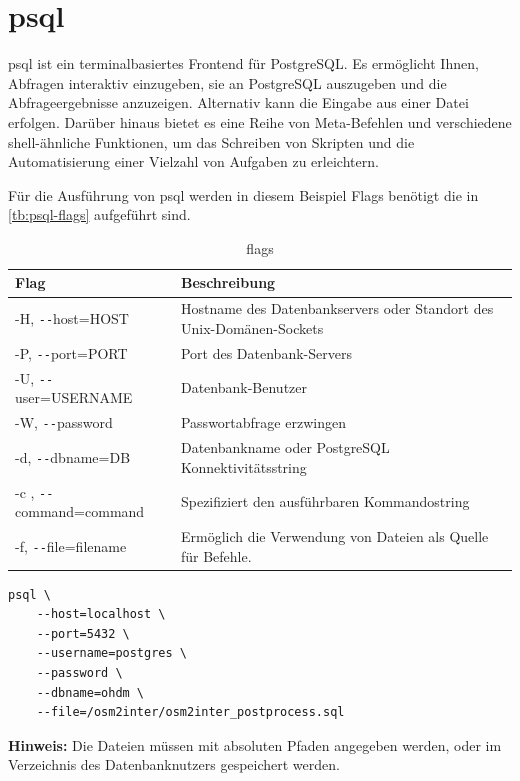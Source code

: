 \chapter{psql}
psql ist ein terminalbasiertes Frontend für PostgreSQL. Es ermöglicht Ihnen, Abfragen interaktiv einzugeben, sie an PostgreSQL auszugeben und die Abfrageergebnisse anzuzeigen. Alternativ kann die Eingabe aus einer Datei erfolgen. Darüber hinaus bietet es eine Reihe von Meta-Befehlen und verschiedene shell-ähnliche Funktionen, um das Schreiben von Skripten und die Automatisierung einer Vielzahl von Aufgaben zu erleichtern.\cite{postgres-psql}

Für die Ausführung von psql werden in diesem Beispiel Flags benötigt die in \autoref{tb:psql-flags} aufgeführt sind.
\begin{table}[h]
	\caption{flags}
	\label{tb:psql-flags}
	\renewcommand{\arraystretch}{1.5}
	\begin{tabularx}{\linewidth}{|l|X|}\hline
		\textbf{Flag} & \textbf{Beschreibung}\\\hline
		-H, \texttt{-{}-}host=HOST & Hostname des Datenbankservers oder Standort des Unix-Domänen-Sockets\\\hline
		-P, \texttt{-{}-}port=PORT & Port des Datenbank-Servers\\\hline
		-U, \texttt{-{}-}user=USERNAME & Datenbank-Benutzer\\\hline
		-W, \texttt{-{}-}password & Passwortabfrage erzwingen\\\hline
		-d, \texttt{-{}-}dbname=DB & Datenbankname oder PostgreSQL Konnektivitätsstring\\\hline
		
		-c , \texttt{-{}-}command=command & Spezifiziert den ausführbaren Kommandostring\\\hline
		-f, \texttt{-{}-}file=filename & Ermöglich die Verwendung von Dateien als Quelle für Befehle.\\\hline
	\end{tabularx}\vspace{0.5cm}
\end{table}
\begin{lstlisting}[language={},basicstyle=\ttfamily,caption={Beispiel eines \gequote{psql} Befehls mit dem postprocess.sql Skript}]
	psql \
	--host=localhost \
	--port=5432 \
	--username=postgres \
	--password \
	--dbname=ohdm \
	--file=/osm2inter/osm2inter_postprocess.sql
\end{lstlisting}
\textbf{Hinweis:} Die Dateien müssen mit absoluten Pfaden angegeben werden, oder im Verzeichnis des Datenbanknutzers gespeichert werden.\\

